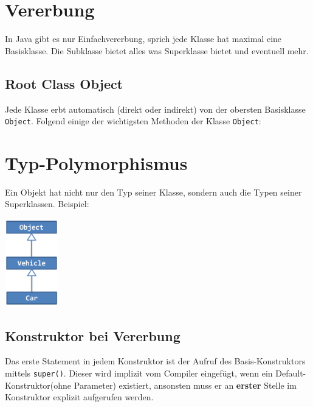 \section*{Vererbung}
	In Java gibt es nur Einfachvererbung, sprich jede Klasse hat maximal eine Basisklasse. Die Subklasse bietet alles was Superklasse bietet und eventuell mehr.\\
	\begin{minipage}[t]{8cm}
		\subsection*{Root Class Object}
		Jede Klasse erbt automatisch (direkt oder indirekt) von der obersten Basisklasse \texttt{Object}. Folgend einige der wichtigsten Methoden der Klasse \texttt{Object}:
		
		\section*{Typ-Polymorphismus}
		Ein Objekt hat nicht nur den Typ seiner Klasse, sondern auch die Typen seiner Superklassen. Beispiel:
		\begin{minipage}[t]{5cm}
			
		\end{minipage}
		\hspace*{0.5cm}
		\begin{minipage}[b]{2.3cm}
			\includegraphics[height=3.8cm, align=t]{pics/Typ_Polymorphismus.PNG}
		\end{minipage}
	\end{minipage}
	\hspace*{0.5cm}
	\begin{minipage}[t]{10.3cm}
		\subsection*{Konstruktor bei Vererbung}
			Das erste Statement in jedem Konstruktor ist der Aufruf des Basis-Konstruktors mittels \texttt{super()}. Dieser wird implizit vom Compiler eingefügt, wenn ein Default-Konstruktor(ohne Parameter) existiert, ansonsten muss er an \textbf{erster} Stelle im Konstruktor explizit aufgerufen werden.
			
	\end{minipage}

	
	
